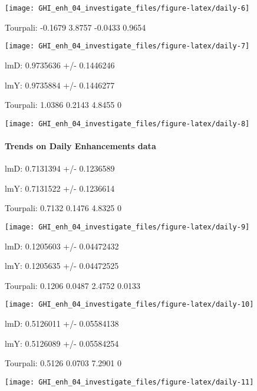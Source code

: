 \documentclass[
  10pt,
  a4paper,oneside]{article}
\begin{document}
\begin{center}\texttt{[image: GHI\_enh\_04\_investigate\_files/figure-latex/daily-6]} \end{center}

Tourpali: -0.1679 3.8757 -0.0433 0.9654

\begin{center}\texttt{[image: GHI\_enh\_04\_investigate\_files/figure-latex/daily-7]} \end{center}

lmD: 0.9735636 +/- 0.1446246

lmY: 0.9735884 +/- 0.1446277

Tourpali: 1.0386 0.2143 4.8455 0

\begin{center}\texttt{[image: GHI\_enh\_04\_investigate\_files/figure-latex/daily-8]} \end{center}

\newpage

\hypertarget{trends-on-daily-enhancements-data}{%
\paragraph{Trends on Daily Enhancements data}\label{trends-on-daily-enhancements-data}}

lmD: 0.7131394 +/- 0.1236589

lmY: 0.7131522 +/- 0.1236614

Tourpali: 0.7132 0.1476 4.8325 0

\begin{center}\texttt{[image: GHI\_enh\_04\_investigate\_files/figure-latex/daily-9]} \end{center}

lmD: 0.1205603 +/- 0.04472432

lmY: 0.1205635 +/- 0.04472525

Tourpali: 0.1206 0.0487 2.4752 0.0133

\begin{center}\texttt{[image: GHI\_enh\_04\_investigate\_files/figure-latex/daily-10]} \end{center}

lmD: 0.5126011 +/- 0.05584138

lmY: 0.5126089 +/- 0.05584254

Tourpali: 0.5126 0.0703 7.2901 0

\begin{center}\texttt{[image: GHI\_enh\_04\_investigate\_files/figure-latex/daily-11]} \end{center}
\end{document}
